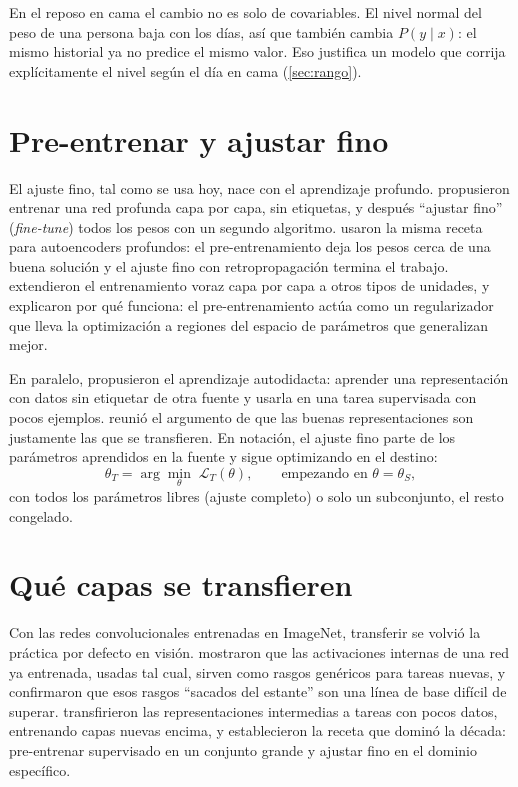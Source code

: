 En el reposo en cama el cambio no es solo de covariables. El nivel normal del peso de una persona baja con los días,
así que también cambia $P(y \mid x)$: el mismo historial ya no predice el mismo valor. Eso justifica un modelo que
corrija explícitamente el nivel según el día en cama (\cref{sec:rango}).

\section{Pre-entrenar y ajustar fino}

El ajuste fino, tal como se usa hoy, nace con el aprendizaje profundo. \textcite{hinton2006dbn} propusieron entrenar
una red profunda capa por capa, sin etiquetas, y después \enquote{ajustar fino} (\emph{fine-tune}) todos los pesos con
un segundo algoritmo. \textcite{hinton2006science} usaron la misma receta para autoencoders profundos: el
pre-entrenamiento deja los pesos cerca de una buena solución y el ajuste fino con retropropagación termina el trabajo.
\textcite{bengio2007} extendieron el entrenamiento voraz capa por capa a otros tipos de unidades, y
\textcite{erhan2010} explicaron por qué funciona: el pre-entrenamiento actúa como un regularizador que lleva la
optimización a regiones del espacio de parámetros que generalizan mejor.

En paralelo, \textcite{raina2007} propusieron el aprendizaje autodidacta: aprender una representación con datos sin
etiquetar de otra fuente y usarla en una tarea supervisada con pocos ejemplos. \textcite{bengio2012} reunió el
argumento de que las buenas representaciones son justamente las que se transfieren. En notación, el ajuste fino parte
de los parámetros aprendidos en la fuente y sigue optimizando en el destino:
\begin{equation}\label{eq:ajuste}
\theta_T = \arg\min_{\theta}\; \mathcal{L}_T(\theta), \qquad \text{empezando en } \theta = \theta_S ,
\end{equation}
con todos los parámetros libres (ajuste completo) o solo un subconjunto, el resto congelado.

\section{Qué capas se transfieren}

Con las redes convolucionales entrenadas en ImageNet, transferir se volvió la práctica por defecto en visión.
\textcite{donahue2014} mostraron que las activaciones internas de una red ya entrenada, usadas tal cual, sirven como
rasgos genéricos para tareas nuevas, y \textcite{razavian2014} confirmaron que esos rasgos \enquote{sacados del
estante} son una línea de base difícil de superar. \textcite{oquab2014} transfirieron las representaciones intermedias a tareas con pocos
datos, entrenando capas nuevas encima, y \textcite{girshick2014} establecieron la receta que dominó la década: pre-entrenar
supervisado en un conjunto grande y ajustar fino en el dominio específico.

